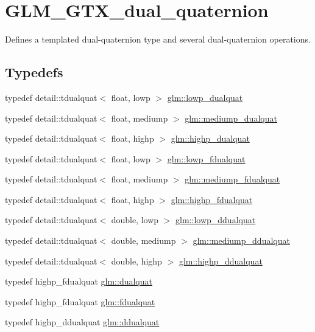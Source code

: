\hypertarget{group__gtc__dual__quaternion}{}\section{G\+L\+M\+\_\+\+G\+T\+X\+\_\+dual\+\_\+quaternion}
\label{group__gtc__dual__quaternion}


Defines a templated dual-\/quaternion type and several dual-\/quaternion operations.  


\subsection*{Typedefs}
\begin{DoxyCompactItemize}
\item 
typedef detail\+::tdualquat$<$ float, lowp $>$ \hyperlink{group__gtc__dual__quaternion_gae1772179edc60f4e8b46c8772eeeccee}{glm\+::lowp\+\_\+dualquat}
\item 
typedef detail\+::tdualquat$<$ float, mediump $>$ \hyperlink{group__gtc__dual__quaternion_ga71fc1c10a382330c1fee55ce29703405}{glm\+::mediump\+\_\+dualquat}
\item 
typedef detail\+::tdualquat$<$ float, highp $>$ \hyperlink{group__gtc__dual__quaternion_gaf3a01deb502f53ca555ee1d45e6d6776}{glm\+::highp\+\_\+dualquat}
\item 
typedef detail\+::tdualquat$<$ float, lowp $>$ \hyperlink{group__gtc__dual__quaternion_gae62c636c63c9eb3c1ea6d10f4b7d7c81}{glm\+::lowp\+\_\+fdualquat}
\item 
typedef detail\+::tdualquat$<$ float, mediump $>$ \hyperlink{group__gtc__dual__quaternion_gab211d24786158490e57dfa57d7744f71}{glm\+::mediump\+\_\+fdualquat}
\item 
typedef detail\+::tdualquat$<$ float, highp $>$ \hyperlink{group__gtc__dual__quaternion_ga2ed3283c09d3ffaf52a0e0a4b248eab6}{glm\+::highp\+\_\+fdualquat}
\item 
typedef detail\+::tdualquat$<$ double, lowp $>$ \hyperlink{group__gtc__dual__quaternion_ga29461fddd543ffdf65a199fc28c42458}{glm\+::lowp\+\_\+ddualquat}
\item 
typedef detail\+::tdualquat$<$ double, mediump $>$ \hyperlink{group__gtc__dual__quaternion_ga62d8cbf30e2afd0b1044204268a69066}{glm\+::mediump\+\_\+ddualquat}
\item 
typedef detail\+::tdualquat$<$ double, highp $>$ \hyperlink{group__gtc__dual__quaternion_ga61b654c21f080135aedcf23461eb1037}{glm\+::highp\+\_\+ddualquat}
\item 
typedef highp\+\_\+fdualquat \hyperlink{group__gtc__dual__quaternion_ga2f6227b5f9dc08a2e7682065a84b3aa9}{glm\+::dualquat}
\item 
typedef highp\+\_\+fdualquat \hyperlink{group__gtc__dual__quaternion_ga436906129bc69ca5059555cafcbac9fd}{glm\+::fdualquat}
\item 
typedef highp\+\_\+ddualquat \hyperlink{group__gtc__dual__quaternion_ga373431ffdd82d5c03c258217a9e1f1a6}{glm\+::ddualquat}
\end{DoxyCompactItemize}
